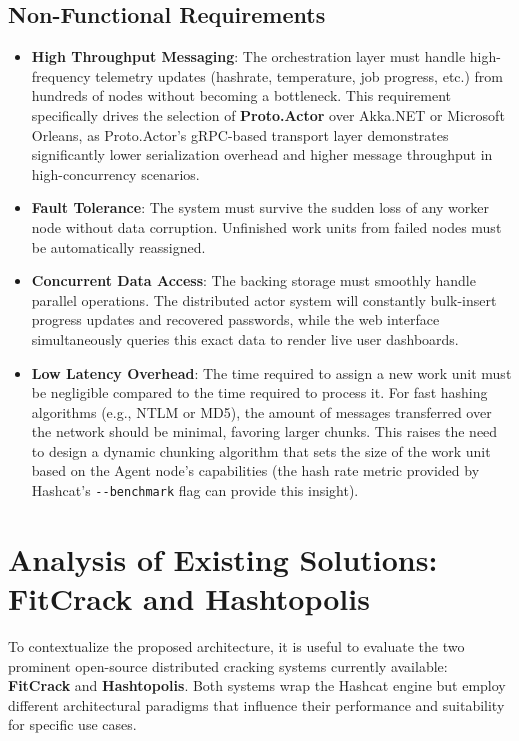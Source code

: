 \subsection{Non-Functional Requirements}

\begin{itemize}
    \item \textbf{High Throughput Messaging}: The orchestration layer must handle high-frequency telemetry updates (hashrate, temperature, job progress, etc.) from hundreds of nodes without becoming a bottleneck. This requirement specifically drives the selection of \textbf{Proto.Actor} over Akka.NET or Microsoft Orleans, as Proto.Actor's gRPC-based transport layer demonstrates significantly lower serialization overhead and higher message throughput in high-concurrency scenarios.

    \item \textbf{Fault Tolerance}: The system must survive the sudden loss of any worker node without data corruption. Unfinished work units from failed nodes must be automatically reassigned.

    \item \textbf{Concurrent Data Access}: The backing storage must smoothly handle parallel operations. The distributed actor system will constantly bulk-insert progress updates and recovered passwords, while the web interface simultaneously queries this exact data to render live user dashboards.

    \item \textbf{Low Latency Overhead}: The time required to assign a new work unit must be negligible compared to the time required to process it. For fast hashing algorithms (e.g., NTLM or MD5), the amount of messages transferred over the network should be minimal, favoring larger chunks. This raises the need to design a dynamic chunking algorithm that sets the size of the work unit based on the Agent node's capabilities (the hash rate metric provided by Hashcat's \verb|--benchmark| flag can provide this insight).
\end{itemize}

\section{Analysis of Existing Solutions: FitCrack and Hashtopolis}

To contextualize the proposed architecture, it is useful to evaluate the two prominent open-source distributed cracking systems currently available: \textbf{FitCrack} and \textbf{Hashtopolis}. Both systems wrap the Hashcat engine but employ different architectural paradigms that influence their performance and suitability for specific use cases.

